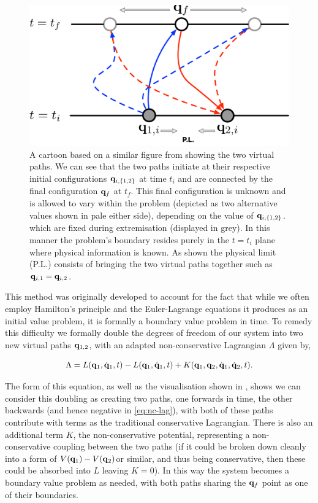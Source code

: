 \begin{figure}[t]
  \includegraphics[width=\columnwidth]{figures/qif-two-paths.pdf}
  \caption{A cartoon based on a similar figure from \cite{galleyClassicalMechanicsNonconservative2013} showing the two virtual paths. We can see that the two paths initiate at their respective initial configurations $\vb{q}_{i,\left\{1,2\right\}}$ at time $t_i$ and are connected by the final configuration $\vb{q}_f$ at $t_f$. This final configuration is unknown and is allowed to vary within the problem (depicted as two alternative values shown in pale either side), depending on the value of $\vb{q}_{i,\left\{1,2\right\}}$. which are fixed during extremisation (displayed in grey). In this manner the problem's boundary resides purely in the $t = t_i$ plane where physical information is known. As shown the physical limit (P.L.) consists of bringing the two virtual paths together such as $\vb{q}_{i, 1} = \vb{q}_{i, 2}$.}
  \label{fig:nc-lagrange-virtual-paths}
\end{figure}

This method was originally developed to account for the fact that while we often employ Hamilton’s principle and the Euler-Lagrange equations it produces as an initial value problem, it is formally a boundary value problem in time. To remedy this difficulty we formally double the degrees of freedom of our system into two new virtual paths $\vb q_{1,2}$, with an adapted non-conservative Lagrangian $\Lambda$ given by,

\begin{equation}
  \label{eq:nc-lag}
  \Lambda = L(\vb{q}_1, \dot{\vb{q}}_1, t) - L(\vb{q}_1, \dot{\vb{q}}_1, t) + K(\vb{q}_1, \vb{q}_2, \dot{\vb{q}}_1, \dot{\vb{q}}_2, t).
\end{equation}

The form of this equation, as well as the visualisation shown in , shows we can consider this doubling as creating two paths, one forwards in time, the other backwards (and hence negative in \eqref{eq:nc-lag}), with both of these paths contribute with terms as the traditional conservative Lagrangian. There is also an additional term $K$, the non-conservative potential, representing a non-conservative coupling between the two paths (if it could be broken down cleanly into a form of $V(\vb{q}_1) - V(\vb{q}_2)$or similar, and thus being conservative, then these could be absorbed into $L$ leaving $K = 0$). In this way the system becomes a boundary value problem as needed, with both paths sharing the $\vb{q}_f$ point as one of their boundaries.

